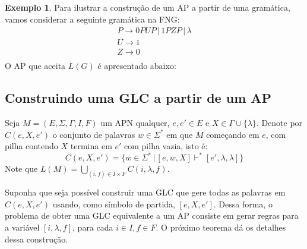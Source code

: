 \documentclass[a4paper]{article}
\theoremstyle{definition}
\newtheorem{Example}{Exemplo}
\begin{document}
  \begin{Example}
    Para ilustrar a construção de um AP a partir de uma gramática, vamos
    considerar a seguinte gramática na FNG:
    \[
      \begin{array}{l}
        P \to 0PUP\,|\,1PZP\,|\,\lambda\\
        U \to 1 \\
        Z \to 0 \\
      \end{array}
    \]
    O AP que aceita $L(G)$ é apresentado abaixo:
    \begin{figure}[H]
      \centering
    \end{figure}
  \end{Example}

  \subsection{Construindo uma GLC a partir de um AP}

  Seja $M = (E,\Sigma,\Gamma,I,F)$ um APN qualquer, $e,e' \in E$ e
  $X \in \Gamma \cup \{\lambda\}$. Denote por $C(e,X,e')$ o conjunto
  de palavras $w \in \Sigma^*$ em que $M$ começando em $e$, com pilha
  contendo $X$ termina em $e'$ com pilha vazia, isto é:
  \[
    C(e,X,e') =\{w \in \Sigma^*\,|\,[e,w,X]\vdash^*[e',\lambda,\lambda]\}
  \]
  Note que $L(M) = \bigcup_{(i,f) \in I \times F} C(i,\lambda,f)$.

  Suponha que seja possível construir uma GLC que gere todas as palavras em
  $C(e,X,e')$ usando, como símbolo de partida, $[e,X,e']$. Dessa forma,
  o problema de obter uma GLC equivalente a um AP consiste em gerar regras
  para a variável $[i,\lambda,f]$, para cada $i \in I, f\in F$. O próximo
  teorema dá os detalhes dessa construção.
\end{document}
